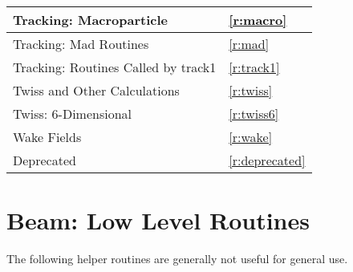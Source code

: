 \begin{center}
\begin{tabular}{|l|l|}
  Tracking: Macroparticle                     & \ref{r:macro}          \\ \hline
  Tracking: Mad Routines                      & \ref{r:mad}            \\ \hline
  Tracking: Routines Called by track1         & \ref{r:track1}         \\ \hline
  Twiss and Other Calculations                & \ref{r:twiss}          \\ \hline
  Twiss: 6-Dimensional                        & \ref{r:twiss6}         \\ \hline
  Wake Fields                                 & \ref{r:wake}           \\ \hline
  Deprecated                                  & \ref{r:deprecated}     \\ \hline
\end{tabular}
\end{center}
\toffset

\section{Beam: Low Level Routines}
\label{r:low.beam}

The following helper routines are generally not useful for general use.

